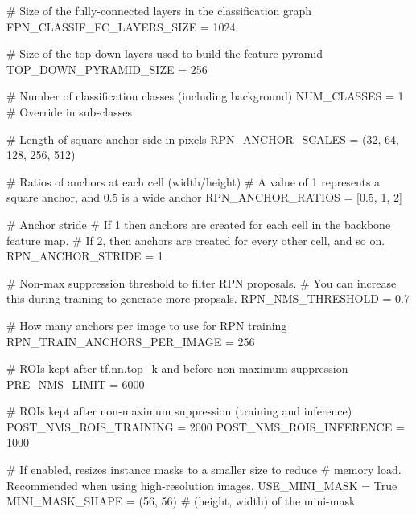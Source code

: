     # Size of the fully-connected layers in the classification graph
    FPN_CLASSIF_FC_LAYERS_SIZE = 1024

    # Size of the top-down layers used to build the feature pyramid
    TOP_DOWN_PYRAMID_SIZE = 256

    # Number of classification classes (including background)
    NUM_CLASSES = 1  # Override in sub-classes

    # Length of square anchor side in pixels
    RPN_ANCHOR_SCALES = (32, 64, 128, 256, 512)

    # Ratios of anchors at each cell (width/height)
    # A value of 1 represents a square anchor, and 0.5 is a wide anchor
    RPN_ANCHOR_RATIOS = [0.5, 1, 2]

    # Anchor stride
    # If 1 then anchors are created for each cell in the backbone feature map.
    # If 2, then anchors are created for every other cell, and so on.
    RPN_ANCHOR_STRIDE = 1

    # Non-max suppression threshold to filter RPN proposals.
    # You can increase this during training to generate more propsals.
    RPN_NMS_THRESHOLD = 0.7

    # How many anchors per image to use for RPN training
    RPN_TRAIN_ANCHORS_PER_IMAGE = 256
    
    # ROIs kept after tf.nn.top_k and before non-maximum suppression
    PRE_NMS_LIMIT = 6000

    # ROIs kept after non-maximum suppression (training and inference)
    POST_NMS_ROIS_TRAINING = 2000
    POST_NMS_ROIS_INFERENCE = 1000

    # If enabled, resizes instance masks to a smaller size to reduce
    # memory load. Recommended when using high-resolution images.
    USE_MINI_MASK = True
    MINI_MASK_SHAPE = (56, 56)  # (height, width) of the mini-mask

